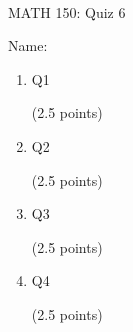 \documentclass[11pt]{article}
\newcommand{\vs}{\vspace{0.2in}}
\begin{document}
\tt
\centerline{MATH 150: Quiz 6}
\vs

Name: \underline{\hspace{5cm}}

\medskip

\begin{enumerate}

\item
Q1

(2.5 points)
\vspace{3in}

\item
Q2

(2.5 points)

\newpage

\item
Q3

(2.5 points)
\vspace{3in}

\item
Q4

(2.5 points)

\end{enumerate}
\end{document}
